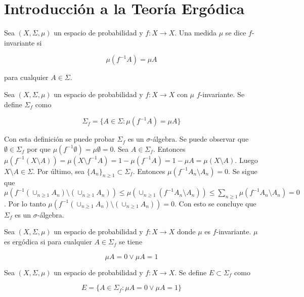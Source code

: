 \section{Introducción a la Teoría Ergódica}

\begin{definicion}
	Sea $(X,\Sigma,\mu)$ un espacio de probabilidad y $f: X \rightarrow X$. Una medida $\mu$ se dice $f$-invariante si
	
	\begin{equation}
		\mu(f^{-1}A) = \mu A
	\end{equation}
	
	para cualquier $A \in \Sigma$.
\end{definicion}

\begin{definicion}
	Sea $(X,\Sigma,\mu)$ un espacio de probabilidad y $f: X \rightarrow X$ con $\mu$ $f$-invariante. Se define $\Sigma_f$ como
	
	\begin{equation}
		\Sigma_f = \{ A \in \Sigma: \mu(f^{-1}A) = \mu A \}
	\end{equation}
\end{definicion}

Con esta definición se puede probar $\Sigma_f$ es un $\sigma$-álgebra. Se puede observar que $\emptyset \in \Sigma_f$ por que $\mu(f^{-1} \emptyset) = \mu \emptyset = 0$. Sea $A \in \Sigma_f$. Entonces $\mu(f^{-1}(X \setminus A)) =  \mu(X \setminus f^{-1}A) = 1 - \mu(f^{-1}A) = 1 - \mu A = \mu(X \setminus A)$. Luego $X \setminus A \in \Sigma$. Por último, sea $\{A_n\}_{n \geq 1} \subset \Sigma_f$. Entonces $\mu(f^{-1}A_n \setminus A_n) = 0$. Se sigue que $\mu(f^{-1}(\cup_{n \geq 1} A_n) \setminus (\cup_{n \geq 1} A_n)) \leq \mu(\cup_{n \geq 1} (f^{-1}A_n \setminus A_n)) \leq \sum_{n \geq 1} \mu(f^{-1}A_n \setminus A_n) = 0$. Por lo tanto $\mu(f^{-1}(\cup_{n \geq 1} A_n) \setminus (\cup_{n \geq 1} A_n)) = 0$. Con esto se concluye que $\Sigma_f$ es un $\sigma$-álgebra. 

\begin{definicion}
	Sea $(X,\Sigma,\mu)$ un espacio de probabilidad y $f: X \rightarrow X$ donde $\mu$ es $f$-invariante. $\mu$ es ergódica si para cualquier $A \in \Sigma_f$ se tiene
	
	\begin{equation}
		\mu A = 0 \vee \mu A = 1
	\end{equation}
\end{definicion}

\begin{definicion}
	Sea $(X,\Sigma,\mu)$ un espacio de probabilidad y $f: X \rightarrow X$. Se define $E \subset \Sigma_f$ como
	
	\begin{equation}
		E = \{ A \in \Sigma_f: \mu A = 0 \vee \mu A = 1 \}
	\end{equation}
\end{definicion}

